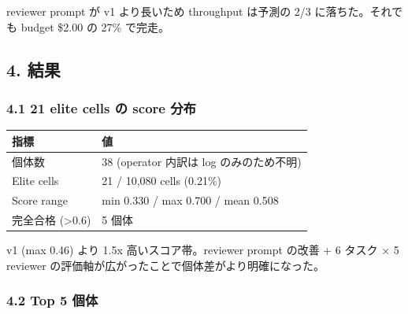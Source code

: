 \documentclass[
]{ltjsarticle}
\newcounter{none} %
\begin{document}
reviewer prompt が v1 より長いため throughput は予測の 2/3
に落ちた。それでも budget \$2.00 の 27\% で完走。

\subsection{4. 結果}\label{ux7d50ux679c}

\subsubsection{4.1 21 elite cells の score
分布}\label{elite-cells-ux306e-score-ux5206ux5e03}

{\def\LTcaptype{none} %
\begin{longtable}[]{@{}ll@{}}
\toprule\noalign{}
指標 & 値 \\
\midrule\noalign{}
\endhead
\bottomrule\noalign{}
\endlastfoot
個体数 & 38 (operator 内訳は log のみのため不明) \\
Elite cells & 21 / 10,080 cells (0.21\%) \\
Score range & min 0.330 / max 0.700 / mean 0.508 \\
完全合格 (\textgreater0.6) & 5 個体 \\
\end{longtable}
}

v1 (max 0.46) より 1.5x 高いスコア帯。reviewer prompt の改善 + 6 タスク
× 5 reviewer の評価軸が広がったことで個体差がより明確になった。

\subsubsection{4.2 Top 5 個体}\label{top-5-ux500bux4f53}
\end{document}
